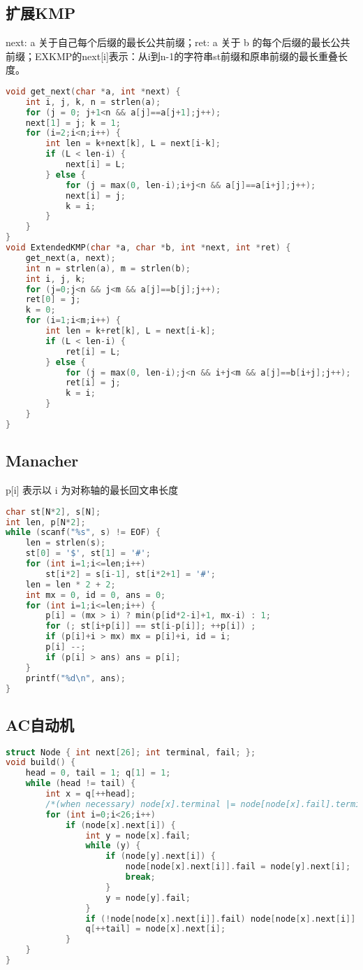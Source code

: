 \documentclass[landscape,a4paper]{article}
\begin{document}
\subsection{扩展KMP}

next:  a 关于自己每个后缀的最长公共前缀；ret: a 关于 b 的每个后缀的最长公共前缀；EXKMP的next[i]表示：从i到n-1的字符串st前缀和原串前缀的最长重叠长度。

\begin{lstlisting}[language=C++]
void get_next(char *a, int *next) {
	int i, j, k, n = strlen(a);
	for (j = 0; j+1<n && a[j]==a[j+1];j++);
	next[1] = j; k = 1;
	for (i=2;i<n;i++) {
		int len = k+next[k], L = next[i-k];
		if (L < len-i) {
			next[i] = L;
		} else {
			for (j = max(0, len-i);i+j<n && a[j]==a[i+j];j++);
			next[i] = j;
			k = i;
		}
	}
}
void ExtendedKMP(char *a, char *b, int *next, int *ret) {
	get_next(a, next);
	int n = strlen(a), m = strlen(b);
	int i, j, k;
	for (j=0;j<n && j<m && a[j]==b[j];j++);
	ret[0] = j;
	k = 0;
	for (i=1;i<m;i++) {
		int len = k+ret[k], L = next[i-k];
		if (L < len-i) {
			ret[i] = L;
		} else {
			for (j = max(0, len-i);j<n && i+j<m && a[j]==b[i+j];j++);
			ret[i] = j;
			k = i;
		}
	}
}
\end{lstlisting}

\subsection{Manacher}
p[i] 表示以 i 为对称轴的最长回文串长度
\begin{lstlisting}[language=C++]
char st[N*2], s[N];
int len, p[N*2];
while (scanf("%s", s) != EOF) {
	len = strlen(s);
	st[0] = '$', st[1] = '#';
	for (int i=1;i<=len;i++)
		st[i*2] = s[i-1], st[i*2+1] = '#';
	len = len * 2 + 2;
	int mx = 0, id = 0, ans = 0;
	for (int i=1;i<=len;i++) {
		p[i] = (mx > i) ? min(p[id*2-i]+1, mx-i) : 1;
		for (; st[i+p[i]] == st[i-p[i]]; ++p[i]) ;
		if (p[i]+i > mx) mx = p[i]+i, id = i;
		p[i] --;
		if (p[i] > ans) ans = p[i];
	}
	printf("%d\n", ans);
}
\end{lstlisting}

\subsection{AC自动机}
\begin{lstlisting}[language=C++]
struct Node { int next[26]; int terminal, fail; };
void build() {
	head = 0, tail = 1; q[1] = 1;
	while (head != tail) {
		int x = q[++head];
		/*(when necessary) node[x].terminal |= node[node[x].fail].terminal; */
		for (int i=0;i<26;i++)
			if (node[x].next[i]) {
				int y = node[x].fail;
				while (y) {
					if (node[y].next[i]) {
						node[node[x].next[i]].fail = node[y].next[i];
						break;
					}
					y = node[y].fail;
				}
				if (!node[node[x].next[i]].fail) node[node[x].next[i]].fail = 1;
				q[++tail] = node[x].next[i];
			}
	}
}
\end{lstlisting}
\end{document}
